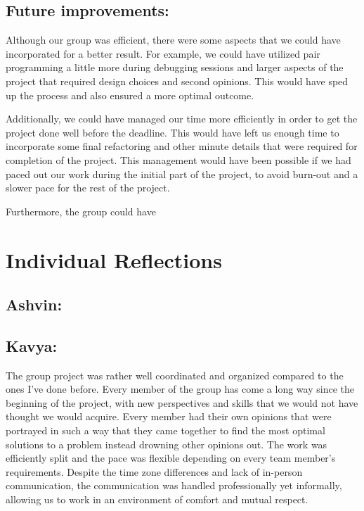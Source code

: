 \documentclass[a4paper]{article}
\begin{document}
\subsection{Future improvements:}
Although our group was efficient, there were some aspects that we could have incorporated for a better result. For example, we could have utilized pair programming a little more during debugging sessions and larger aspects of the project that required design choices and second opinions. This would have sped up the process and also ensured a more optimal outcome.

Additionally, we could have managed our time more efficiently in order to get the project done well before the deadline. This would have left us enough time to incorporate some final refactoring and other minute details that were required for completion of the project. This management would have been possible if we had paced out our work during the initial part of the project, to avoid burn-out and a slower pace for the rest of the project. 

Furthermore, the group could have

\section{Individual Reflections}
\subsection{Ashvin:}
\lipsum[1-1]
\subsection{Kavya:}
The group project was rather well coordinated and organized compared to the ones I've done before. Every member of the group has come a long way since the beginning of the project, with new perspectives and skills that we would not have thought we would acquire. Every member had their own opinions that were portrayed in such a way that they came together to find the most optimal solutions to a problem instead drowning other opinions out. The work was efficiently split and the pace was flexible depending on every team member's requirements. Despite the time zone differences and lack of in-person communication, the communication was handled professionally yet informally, allowing us to work in an environment of comfort and mutual respect.
\end{document}
